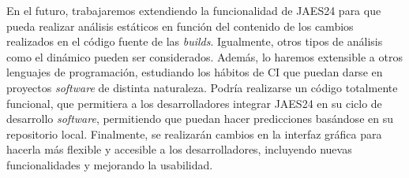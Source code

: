 En el futuro, trabajaremos extendiendo la funcionalidad de JAES24 para que pueda
realizar análisis estáticos en función del contenido de los cambios realizados en el código
fuente de las \textit{builds}. Igualmente, otros tipos de análisis como el dinámico
pueden ser considerados. Además, lo haremos extensible a otros lenguajes de programación, estudiando los hábitos
de CI que puedan darse en proyectos \textit{software} de distinta naturaleza. Podría
realizarse un código totalmente funcional, que permitiera a los desarrolladores integrar
JAES24 en su ciclo de desarrollo \textit{software}, permitiendo que puedan hacer
predicciones basándose en su repositorio local. Finalmente, se realizarán cambios en la
interfaz gráfica para hacerla más flexible y accesible a los desarrolladores, incluyendo nuevas
funcionalidades y mejorando la usabilidad.\\
